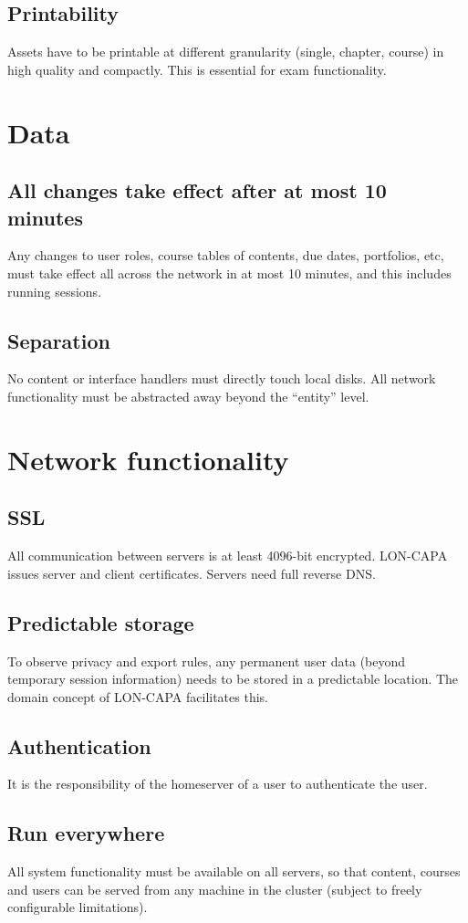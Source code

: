 \subsection{Printability}
Assets have to be printable at different granularity (single, chapter, course) in high quality and compactly. This is essential for exam functionality.
\section{Data}
\subsection{All changes take effect after at most 10 minutes}
Any changes to user roles, course tables of contents, due dates, portfolios, etc, must take effect all across the network in at most 10 minutes, and this includes running sessions.
\subsection{Separation}
No content or interface handlers must directly touch local disks. All network functionality must be abstracted away beyond the ``entity'' level.
\section{Network functionality}
\subsection{SSL}
All communication between servers is at least 4096-bit encrypted. LON-CAPA issues server and client certificates. Servers need full reverse DNS.
\subsection{Predictable storage}
To observe privacy and export rules, any permanent user data (beyond temporary session information) needs to be stored in a predictable location. The domain concept of LON-CAPA facilitates this.
\subsection{Authentication}
It is the responsibility of the homeserver of a user to authenticate the user.
\subsection{Run everywhere}
All system functionality must be available on all servers, so that content, courses and users can be served from any machine in the cluster (subject to freely configurable limitations).
